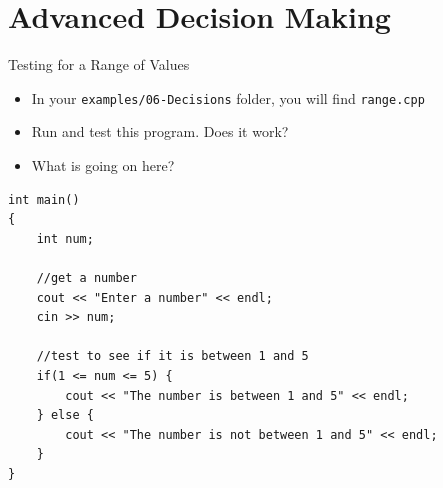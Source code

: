 \documentclass[]{beamer}
\begin{document}
\section{Advanced Decision Making}


\begin{frame}[fragile]{Testing for a Range of Values}
  \begin{itemize}[<+->]
    \item In your \texttt{examples/06-Decisions} folder, you will find \texttt{range.cpp}
    \item Run and test this program.  Does it work?
    \item What is going on here?
  \end{itemize}
  \begin{adjustbox}{max height=4.75cm}
  \begin{BVerbatim}
int main()
{
    int num;

    //get a number
    cout << "Enter a number" << endl;
    cin >> num;

    //test to see if it is between 1 and 5
    if(1 <= num <= 5) {
        cout << "The number is between 1 and 5" << endl;
    } else {
        cout << "The number is not between 1 and 5" << endl;
    }
}
  \end{BVerbatim}
  \end{adjustbox}
\end{frame}
\end{document}
